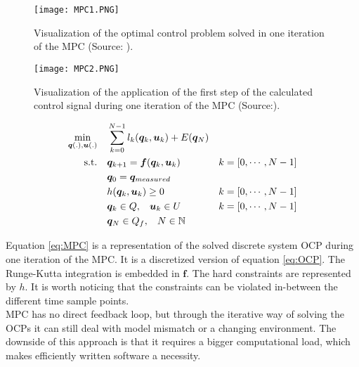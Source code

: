 \begin{figure}[h!]
	\centering
	\texttt{[image: MPC1.PNG]}
	\caption{Visualization of the optimal control problem solved in one iteration of the MPC (Source: \cite{Patrinos2019}).}
	\label{fig:MPC1}
\end{figure}

\begin{figure}[h!]
	\centering
	\texttt{[image: MPC2.PNG]}
	\caption{Visualization of the application of the first step of the calculated control signal during one iteration of the MPC (Source:\cite{Patrinos2019}).}
	\label{fig:MPC2}
\end{figure}

\newpage
\begin{equation}
\label{eq:MPC}
\begin{aligned}
\min_{\bm{q}(.),\bm{u}(.)} \quad & \sum_{k = 0}^{N-1}l_{k}(\bm{q}_{k},\bm{u}_{k}) + E(\bm{q}_{N}) \\
\textrm{s.t.} \quad & \bm{q}_{k+1} = \bm{f}(\bm{q}_{k}, \bm{u}_{k}) & k = [0,\cdots, N-1]\\
& \bm{q}_{0}= \bm{q}_{measured} \\
& h(\bm{q}_{k},\bm{u}_{k}) \geq 0	& k = [0,\cdots, N-1]\\
& \bm{q}_{k}\in Q,\hspace{3 mm} \bm{u}_{k}\in U \hspace{3 mm} & k = [0,\cdots, N-1]\\
& \bm{q}_{N}\in Q_f,\hspace{3 mm} N \in \mathbb{N}
\end{aligned}
\end{equation}






Equation \ref{eq:MPC} is a representation of the solved discrete system OCP during one iteration of the MPC. It is a discretized version of equation \ref{eq:OCP}. The Runge-Kutta integration is embedded in $\bm{f}$. The hard constraints are represented by $h$. It is worth noticing that the constraints can be violated in-between the different time sample points.\\

MPC has no direct feedback loop, but through the iterative way of solving the OCPs it can still deal with model mismatch or a changing environment. The downside of this approach is that it requires a bigger computational load, which makes efficiently written software a necessity. 


